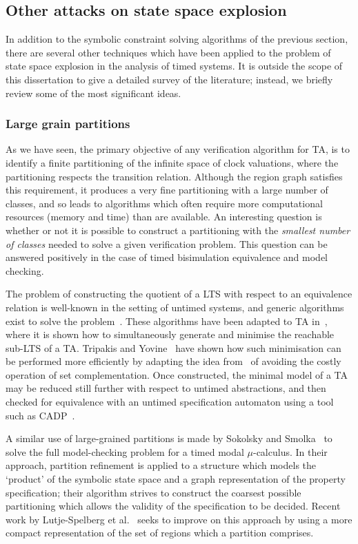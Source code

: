 {\subsection{Other attacks on state space explosion \label{ss:mscstateexplosion}}
In addition to the symbolic constraint solving algorithms of the
previous section, there are several other techniques which have been
applied to the problem of state space explosion in the analysis of
timed systems.  It is outside the scope of this dissertation to give a
detailed survey of the literature; instead, we briefly review some of
the most significant ideas.

\subsubsection{Large grain partitions} 
As we have seen, the primary objective of any verification algorithm
for TA, is to identify a finite partitioning of the infinite space of
clock valuations, where the partitioning respects the transition
relation. Although the region graph satisfies this requirement, it
produces a very fine partitioning with a large number of classes, and
so leads to algorithms which often require more computational
resources (memory and time) than are available. An interesting
question is whether or not it is possible to construct a partitioning
with the \emph{smallest number of classes} needed to solve a given
verification problem. This question can be answered positively in the
case of timed bisimulation equivalence and model checking. 

The problem of constructing the quotient of a LTS with respect to an
equivalence relation is well-known in the setting of untimed systems,
and generic algorithms exist to solve the problem~\cite{bfh:92,ly:92}.
These algorithms have been adapted to TA in~\cite{acd:92,ach:92},
where it is shown how to simultaneously generate and minimise the
reachable sub-LTS of a TA.  Tripakis and Yovine~\cite{ty:96} have
shown how such minimisation can be performed more efficiently by
adapting the idea from~\cite{yl:93} of avoiding the costly operation
of set complementation. Once constructed, the minimal model of a TA
may be reduced still further with respect to untimed abstractions, and
then checked for equivalence with an untimed specification automaton
using a tool such as CADP~\cite{fgk:96}.  

A similar use of large-grained partitions is made by Sokolsky and
Smolka~\cite{ss:95,sok:96} to solve the full model-checking problem
for a timed modal $\mu$-calculus. In their approach, partition
refinement is applied to a structure which models the `product' of the
symbolic state space and a graph representation of the property
specification; their algorithm strives to construct the coarsest
possible partitioning which allows the validity of the specification
to be decided. Recent work by Lutje-Spelberg et al.~\cite{lta:98} seeks to
improve on this approach by using a more compact representation
of the set of regions which a partition comprises.

}
